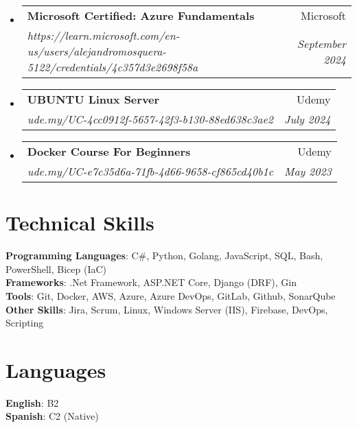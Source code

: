 \documentclass[letterpaper,11pt]{article}
\makeatletter
\newcommand{\resumeSubheading}[4]{
  \vspace{-2pt}\item
    \begin{tabular*}{0.97\textwidth}[t]{l@{\extracolsep{\fill}}r}
      \textbf{#1} & #2 \\
      \textit{\small#3} & \textit{\small #4} \\
    \end{tabular*}\vspace{-7pt}
}
\newcommand{\resumeSubHeadingListStart}{\begin{itemize}[leftmargin=0.15in, label={}]}
\newcommand{\resumeSubHeadingListEnd}{\end{itemize}}
\makeatother
\begin{document}
  \resumeSubHeadingListStart
    \resumeSubheading
      {Microsoft Certified: Azure Fundamentals}{Microsoft}
      {https://learn.microsoft.com/en-us/users/alejandromosquera-5122/credentials/4c357d3e2698f58a}{September 2024}
  \resumeSubHeadingListEnd
  
  \resumeSubHeadingListStart
    \resumeSubheading
      {UBUNTU Linux Server}{Udemy}
      {ude.my/UC-4cc0912f-5657-42f3-b130-88ed638c3ae2}{July 2024}
  \resumeSubHeadingListEnd

  \resumeSubHeadingListStart
    \resumeSubheading
      {Docker Course For Beginners}{Udemy}
      {ude.my/UC-e7c35d6a-71fb-4d66-9658-cf865cd40b1c}{May 2023}
  \resumeSubHeadingListEnd



%

\section{Technical Skills}
 \begin{itemize}[leftmargin=0.15in, label={}]
    \small{\item{
     \textbf{Programming Languages}{: C\#, Python, Golang, JavaScript, SQL, Bash, PowerShell, Bicep (IaC)} \\
     \textbf{Frameworks}{: .Net Framework, ASP.NET Core, Django (DRF), Gin} \\
     \textbf{Tools}{: Git, Docker, AWS, Azure, Azure DevOps, GitLab, Github, SonarQube} \\
     \textbf{Other Skills}{: Jira, Scrum, Linux, Windows Server (IIS), Firebase, DevOps, Scripting}
    }}
 \end{itemize}

\section{Languages}
 \begin{itemize}[leftmargin=0.15in, label={}]
    \small{\item{
     \textbf{English}{: B2} \\
     \textbf{Spanish}{: C2 (Native)} \\
    }}
 \end{itemize}

\end{document}
